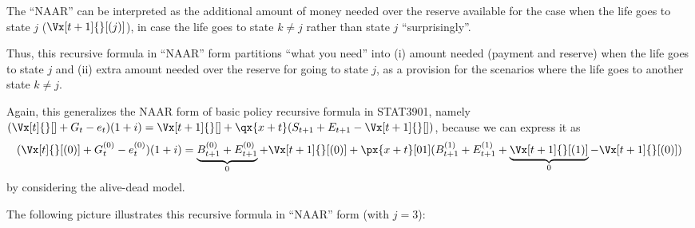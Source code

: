 \begin{enumerate}
The ``NAAR'' can be interpreted as the additional amount of money needed over
the reserve available for the case when the life goes to state \(j\)
(\(\Vx[t+1]{}[(j)]\)), in case the life goes to state \(k\ne j\) rather than
state \(j\) ``surprisingly''.

Thus, this recursive formula in ``NAAR'' form partitions ``what you need'' into
(i) amount needed (payment and reserve) when the life goes to state \(j\) and
(ii) extra amount needed over the reserve for going to state \(j\), as a
provision for the scenarios where the life goes to another state \(k\ne j\).

Again, this generalizes the NAAR form of basic policy recursive formula in
STAT3901, namely\\
\((\Vx[t]{}[]+G_t-e_t)(1+i)=\Vx[t+1]{}[]+\qx{x+t}(S_{t+1}+E_{t+1}-\Vx[t+1]{}[])\),
because we can express it as
\[
(\Vx[t]{}[(0)]+G_t^{(0)}-e_t^{(0)})(1+i)=\underbrace{B_{t+1}^{(0)}+E_{t+1}^{(0)}}_{0}+\Vx[t+1]{}[(0)]
+\px{x+t}[01](B_{t+1}^{(1)}+E_{t+1}^{(1)}+\underbrace{\Vx[t+1]{}[(1)]}_{0}-\Vx[t+1]{}[(0)])
\]
by considering the alive-dead model.

The following picture illustrates this recursive formula in ``NAAR'' form (with
\(j=3\)):
\begin{center}
\end{center}


\end{enumerate}

